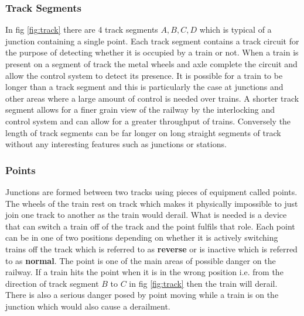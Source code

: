 \subsubsection{Track Segments}

In fig \ref{fig:track}  there are 4 track segments $A,B,C,D$ which is typical of a junction containing a single point. Each track segment contains a track circuit for the purpose of detecting whether it is occupied by a train or not. When a train is present on a segment of track the metal wheels and axle complete the circuit and allow the control system to detect its presence. It is possible for a train to be longer than a track segment and this is particularly the case at junctions and other areas where a large amount of control is needed over trains. A shorter track segment allows for a finer grain view of the railway by the interlocking and control system and can allow for a greater throughput of trains. Conversely the length of track segments can be far longer on long straight segments of track without any interesting features such as junctions or stations.

\begin{comment}
A section of track is typically broken down into track segments each
containing one or more track circuits to detect the presence of a
train. Typically track segments become larger on long straight stretches of
track without any interesting topological features such as junctions or
stations. Likewise track segments become smaller around junctions and stations
where control over train movement is of greater importance. 
\end{comment}


\subsubsection{Points}
Junctions are formed between two tracks using  pieces of equipment called points. The wheels of the train rest on track which makes it physically impossible to just join one track to another as the train would derail.  What is needed is a device that can switch a train off of the track and the point fulfils that role.  Each point can be in one of two positions depending on whether it is actively switching trains off the track which is referred to as \textbf{reverse}  or is inactive which is referred to as \textbf{normal}. The point is one of the main areas of possible danger on the railway. If a train hits the point when it is in the wrong position i.e. from the direction of track segment $B$ to $C$ in fig \ref{fig:track} then the train will derail. There is also a serious danger posed by point moving while a train is on the junction which would also cause a derailment.

